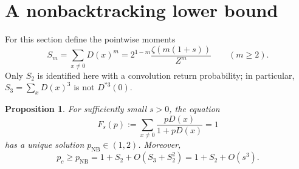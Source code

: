 \documentclass[11pt]{article}
\newtheorem{proposition}[theorem]{Proposition}
\theoremstyle{definition}
\newcommand{\NB}{\mathrm{NB}}
\begin{document}
\section{A nonbacktracking lower bound}\label{sec:lower}

For this section define the pointwise moments
\[
 S_m=\sum_{x\ne0}D(x)^m
 =2^{1-m}\frac{\zeta(m(1+s))}{Z^m}\qquad(m\ge2).
\]
Only $S_2$ is identified here with a convolution return probability;
in particular, $S_3=\sum_xD(x)^3$ is not $D^{*3}(0)$.

\begin{proposition}\label{prop:NB}
For sufficiently small $s>0$, the equation
\begin{equation}\label{eq:NB-root}
 F_s(p):=\sum_{x\ne0}\frac{pD(x)}{1+pD(x)}=1
\end{equation}
has a unique solution $p_\NB\in(1,2)$. Moreover,
\begin{equation}\label{eq:NB-result}
 p_c\ge p_\NB=1+S_2+O(S_3+S_2^2)
              =1+S_2+O(s^3).
\end{equation}
\end{proposition}
\end{document}
